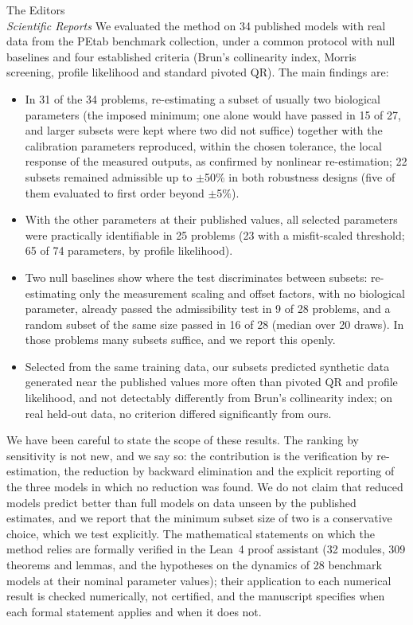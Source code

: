 \documentclass[11pt]{letter}
\begin{document}
\begin{letter}{The Editors\\\emph{Scientific Reports}}
We evaluated the method on 34 published models with real data from the PEtab benchmark collection, under a common protocol with null baselines and four established criteria (Brun's collinearity index, Morris screening, profile likelihood and standard pivoted QR). The main findings are:
\begin{itemize}
\item In 31 of the 34 problems, re-estimating a subset of usually two biological parameters (the imposed minimum; one alone would have passed in 15 of 27, and larger subsets were kept where two did not suffice) together with the calibration parameters reproduced, within the chosen tolerance, the local response of the measured outputs, as confirmed by nonlinear re-estimation; 22 subsets remained admissible up to $\pm$50\% in both robustness designs (five of them evaluated to first order beyond $\pm$5\%).
\item With the other parameters at their published values, all selected parameters were practically identifiable in 25 problems (23 with a misfit-scaled threshold; 65 of 74 parameters, by profile likelihood).
\item Two null baselines show where the test discriminates between subsets: re-estimating only the measurement scaling and offset factors, with no biological parameter, already passed the admissibility test in 9 of 28 problems, and a random subset of the same size passed in 16 of 28 (median over 20 draws). In those problems many subsets suffice, and we report this openly.
\item Selected from the same training data, our subsets predicted synthetic data generated near the published values more often than pivoted QR and profile likelihood, and not detectably differently from Brun's collinearity index; on real held-out data, no criterion differed significantly from ours.
\end{itemize}

We have been careful to state the scope of these results. The ranking by sensitivity is not new, and we say so: the contribution is the verification by re-estimation, the reduction by backward elimination and the explicit reporting of the three models in which no reduction was found. We do not claim that reduced models predict better than full models on data unseen by the published estimates, and we report that the minimum subset size of two is a conservative choice, which we test explicitly. The mathematical statements on which the method relies are formally verified in the Lean~4 proof assistant (32 modules, 309 theorems and lemmas, and the hypotheses on the dynamics of 28 benchmark models at their nominal parameter values); their application to each numerical result is checked numerically, not certified, and the manuscript specifies when each formal statement applies and when it does not.


\end{letter}
\end{document}

